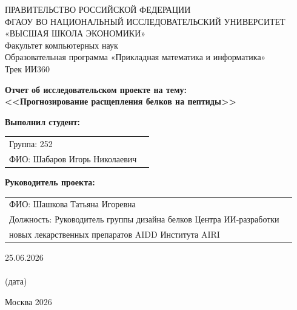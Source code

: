 \documentclass{article}
\begin{document}
\begin{titlepage}
	\newpage
    {
        \begin{center}
            ПРАВИТЕЛЬСТВО РОССИЙСКОЙ ФЕДЕРАЦИИ\\
            ФГАОУ ВО НАЦИОНАЛЬНЫЙ ИССЛЕДОВАТЕЛЬСКИЙ УНИВЕРСИТЕТ\\
            «ВЫСШАЯ ШКОЛА ЭКОНОМИКИ»
            \\
            \bigskip
            Факультет компьютерных наук\\
            Образовательная программа «Прикладная математика и информатика»\\
            Трек ИИ360
        \end{center}
    }
    
    \vspace{2em}
    
    \begin{center}
        {\bf Отчет об исследовательском проекте на тему:}\\
        {\bf <<Прогнозирование расщепления белков на пептиды>>}
    \end{center}
    
    \vspace{3em}
    
    {\bf Выполнил студент:}
    
    \vspace{1em}
		
    {
    \begin{tabular}{ll}
        Группа: 252 & \\
        ФИО: Шабаров Игорь Николаевич & 
    \end{tabular}}
		
    \vspace{3em}
    
    {\bf Руководитель проекта:}
    
    \vspace{1em}
		
    {
    \begin{tabular}{ll}
        ФИО: Шашкова Татьяна Игоревна & \\
        Должность: Руководитель группы дизайна белков Центра ИИ-разработки \\ новых лекарственных препаратов AIDD Института AIRI & 
    \end{tabular}}
	
    \vspace{7em}
		
    \begin{center}
        25.06.2026 \\
    	\underline{\hspace{8cm}} \\
    	(дата)
    \end{center}
		
    \vspace{\fill}
    
    \begin{center}
        Москва 2026
    \end{center}
		
\end{titlepage}
    
\end{document}
